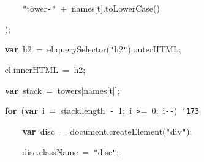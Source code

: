 \documentclass[a4paper,10pt]{article}
\def\mc{\relax}
\begin{document}
\noindent
\mbox{}{\tt\mc \ }{\tt\mc \ }{\tt\mc \ }{\tt\mc \ }{\tt\mc \ }{\tt\mc \ }{\tt\mc \ }{\tt\mc \ }{\tt\mc \ }{\tt\mc \ }{\tt\mc \ }{\tt\mc \ }{\tt\mc \ }{\tt\mc \ }{\tt\mc \ }{\tt\mc \ }{\tt\mc \ }{\tt\mc \ }{\tt\mc \ }{\tt\mc \ }{\tt "}tower{\tt -}{\tt "}{\tt\mc \ }+{\tt\mc \ }names[t].toLowerCase()

\noindent
\mbox{}{\tt\mc \ }{\tt\mc \ }{\tt\mc \ }{\tt\mc \ }{\tt\mc \ }{\tt\mc \ }{\tt\mc \ }{\tt\mc \ }{\tt\mc \ }{\tt\mc \ }{\tt\mc \ }{\tt\mc \ }{\tt\mc \ }{\tt\mc \ }{\tt\mc \ }{\tt\mc \ });

\noindent
\mbox{}{\tt\mc \ }{\tt\mc \ }{\tt\mc \ }{\tt\mc \ }{\tt\mc \ }{\tt\mc \ }{\tt\mc \ }{\tt\mc \ }{\tt\mc \ }{\tt\mc \ }{\tt\mc \ }{\tt\mc \ }{\tt\mc \ }{\tt\mc \ }{\tt\mc \ }{\tt\mc \ }\textbf{var}{\tt\mc \ }h2{\tt\mc \ }={\tt\mc \ }el.querySelector({\tt "}h2{\tt "}).outerHTML;

\noindent
\mbox{}{\tt\mc \ }{\tt\mc \ }{\tt\mc \ }{\tt\mc \ }{\tt\mc \ }{\tt\mc \ }{\tt\mc \ }{\tt\mc \ }{\tt\mc \ }{\tt\mc \ }{\tt\mc \ }{\tt\mc \ }{\tt\mc \ }{\tt\mc \ }{\tt\mc \ }{\tt\mc \ }el.innerHTML{\tt\mc \ }={\tt\mc \ }h2;

\noindent
\mbox{}{\tt\mc \ }{\tt\mc \ }{\tt\mc \ }{\tt\mc \ }{\tt\mc \ }{\tt\mc \ }{\tt\mc \ }{\tt\mc \ }{\tt\mc \ }{\tt\mc \ }{\tt\mc \ }{\tt\mc \ }{\tt\mc \ }{\tt\mc \ }{\tt\mc \ }{\tt\mc \ }\textbf{var}{\tt\mc \ }stack{\tt\mc \ }={\tt\mc \ }towers[names[t]];

\noindent
\mbox{}{\tt\mc \ }{\tt\mc \ }{\tt\mc \ }{\tt\mc \ }{\tt\mc \ }{\tt\mc \ }{\tt\mc \ }{\tt\mc \ }{\tt\mc \ }{\tt\mc \ }{\tt\mc \ }{\tt\mc \ }{\tt\mc \ }{\tt\mc \ }{\tt\mc \ }{\tt\mc \ }\textbf{for}{\tt\mc \ }(\textbf{var}{\tt\mc \ }i{\tt\mc \ }={\tt\mc \ }stack.length{\tt\mc \ }{\tt -}{\tt\mc \ }1;{\tt\mc \ }i{\tt\mc \ }{\tt >}={\tt\mc \ }0;{\tt\mc \ }i{\tt -}{\tt -}){\tt\mc \ }{\tt\char'173}

\noindent
\mbox{}{\tt\mc \ }{\tt\mc \ }{\tt\mc \ }{\tt\mc \ }{\tt\mc \ }{\tt\mc \ }{\tt\mc \ }{\tt\mc \ }{\tt\mc \ }{\tt\mc \ }{\tt\mc \ }{\tt\mc \ }{\tt\mc \ }{\tt\mc \ }{\tt\mc \ }{\tt\mc \ }{\tt\mc \ }{\tt\mc \ }{\tt\mc \ }{\tt\mc \ }\textbf{var}{\tt\mc \ }disc{\tt\mc \ }={\tt\mc \ }document.createElement({\tt "}div{\tt "});

\noindent
\mbox{}{\tt\mc \ }{\tt\mc \ }{\tt\mc \ }{\tt\mc \ }{\tt\mc \ }{\tt\mc \ }{\tt\mc \ }{\tt\mc \ }{\tt\mc \ }{\tt\mc \ }{\tt\mc \ }{\tt\mc \ }{\tt\mc \ }{\tt\mc \ }{\tt\mc \ }{\tt\mc \ }{\tt\mc \ }{\tt\mc \ }{\tt\mc \ }{\tt\mc \ }disc.className{\tt\mc \ }={\tt\mc \ }{\tt "}disc{\tt "};
\end{document}
